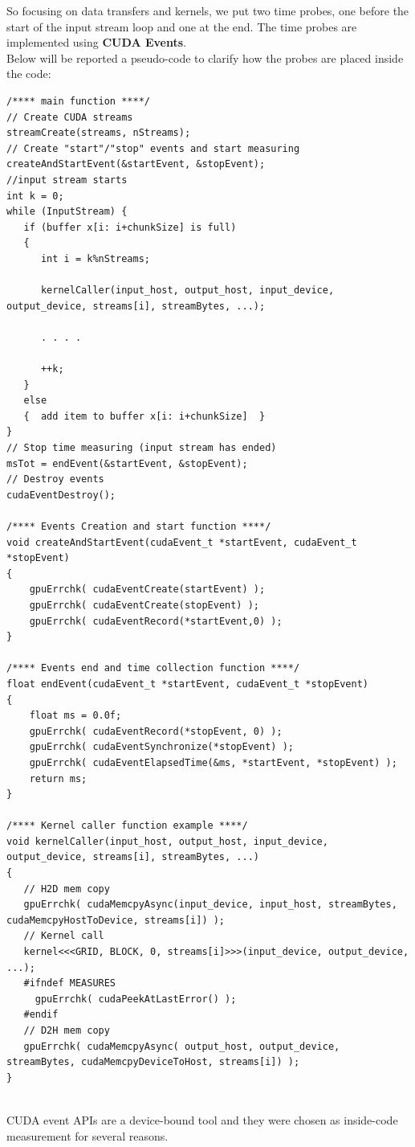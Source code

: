 So focusing on data transfers and kernels, we put two time probes, one before the start of the input stream loop and one at the end. The time probes are implemented using \textbf{CUDA Events}.\\
Below will be reported a pseudo-code to clarify how the probes are placed inside the code:
\begin{lstlisting}[label={lst:timers},caption={Example of code for events utilization as time probes.}]
/**** main function ****/
// Create CUDA streams	
streamCreate(streams, nStreams); 
// Create "start"/"stop" events and start measuring
createAndStartEvent(&startEvent, &stopEvent); 
//input stream starts
int k = 0;
while (InputStream) { 
   if (buffer x[i: i+chunkSize] is full)
   {
      int i = k%nStreams;
	
      kernelCaller(input_host, output_host, input_device, output_device, streams[i], streamBytes, ...);

      . . . .
	
      ++k;
   }
   else
   {  add item to buffer x[i: i+chunkSize]  }	
} 
// Stop time measuring (input stream has ended)
msTot = endEvent(&startEvent, &stopEvent);
// Destroy events
cudaEventDestroy();
		
/**** Events Creation and start function ****/
void createAndStartEvent(cudaEvent_t *startEvent, cudaEvent_t *stopEvent)
{
	gpuErrchk( cudaEventCreate(startEvent) );
	gpuErrchk( cudaEventCreate(stopEvent) );
	gpuErrchk( cudaEventRecord(*startEvent,0) );
}

/**** Events end and time collection function ****/
float endEvent(cudaEvent_t *startEvent, cudaEvent_t *stopEvent)
{
	float ms = 0.0f;
	gpuErrchk( cudaEventRecord(*stopEvent, 0) );
	gpuErrchk( cudaEventSynchronize(*stopEvent) );
	gpuErrchk( cudaEventElapsedTime(&ms, *startEvent, *stopEvent) );
	return ms;
}
	
/**** Kernel caller function example ****/
void kernelCaller(input_host, output_host, input_device, output_device, streams[i], streamBytes, ...)
{
   // H2D mem copy 
   gpuErrchk( cudaMemcpyAsync(input_device, input_host, streamBytes, cudaMemcpyHostToDevice, streams[i]) ); 
   // Kernel call
   kernel<<<GRID, BLOCK, 0, streams[i]>>>(input_device, output_device, ...); 
   #ifndef MEASURES
     gpuErrchk( cudaPeekAtLastError() );
   #endif   
   // D2H mem copy 
   gpuErrchk( cudaMemcpyAsync( output_host, output_device, streamBytes, cudaMemcpyDeviceToHost, streams[i]) );
}
	
\end{lstlisting}
CUDA event APIs are a device-bound tool and they were chosen as inside-code measurement for several reasons.
